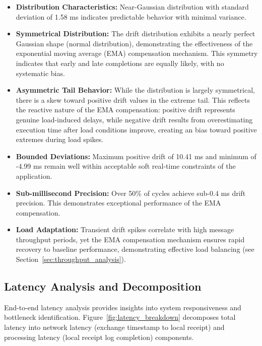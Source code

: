 \documentclass[12pt,a4paper]{article}
\begin{document}
\begin{itemize}
    \item \textbf{Distribution Characteristics:} Near-Gaussian distribution with standard deviation of 1.58 ms indicates predictable behavior with minimal variance.

    \item \textbf{Symmetrical Distribution:} The drift distribution exhibits a nearly perfect Gaussian shape (normal distribution), demonstrating the effectiveness of the exponential moving average (EMA) compensation mechanism. This symmetry indicates that early and late completions are equally likely, with no systematic bias.
    
    \item \textbf{Asymmetric Tail Behavior:} While the distribution is largely symmetrical, there is a skew toward positive drift values in the extreme tail. This reflects the reactive nature of the EMA compensation: positive drift represents genuine load-induced delays, while negative drift results from overestimating execution time after load conditions improve, creating an bias toward positive extremes during load spikes.
    
    \item \textbf{Bounded Deviations:} Maximum positive drift of 10.41 ms and minimum of -4.99 ms remain well within acceptable soft real-time constraints of the application.
                    
    \item \textbf{Sub-millisecond Precision:} Over 50\% of cycles achieve sub-0.4 ms drift precision. This demonstrates exceptional performance of the EMA compensation.

    \item \textbf{Load Adaptation:} Transient drift spikes correlate with high message throughput periods, yet the EMA compensation mechanism ensures rapid recovery to baseline performance, demonstrating effective load balancing (see Section~\ref{sec:throughput_analysis}).

\end{itemize}

\subsection{Latency Analysis and Decomposition}

End-to-end latency analysis provides insights into system responsiveness and bottleneck identification. Figure~\ref{fig:latency_breakdown} decomposes total latency into network latency (exchange timestamp to local receipt) and processing latency (local receipt log completion) components.
\end{document}
